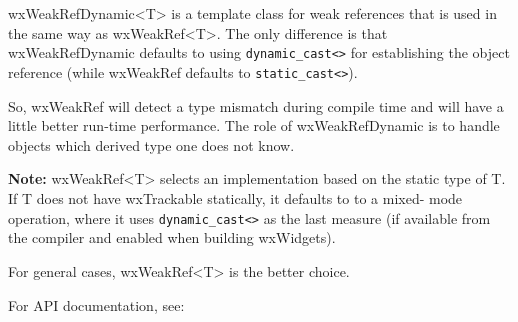 \section{}\label{wxweakrefdynamic}

wxWeakRefDynamic<T> is a template class for weak references that is used in 
the same way as wxWeakRef<T>. The only difference is that wxWeakRefDynamic 
defaults to using \texttt{dynamic\_cast<>} for establishing the object 
reference (while wxWeakRef defaults to \texttt{static\_cast<>}). 

So, wxWeakRef will detect a type mismatch during compile time and will
have a little better run-time performance. The role of wxWeakRefDynamic
is to handle objects which derived type one does not know. 

\textbf{Note:} wxWeakRef<T> selects an implementation based on the static type 
of T. If T does not have wxTrackable statically, it defaults to to a mixed-
mode operation, where it uses \texttt{dynamic\_cast<>} as the last measure (if 
available from the compiler and enabled when building wxWidgets). 

For general cases, wxWeakRef<T> is the better choice. 

For API documentation, see: 

